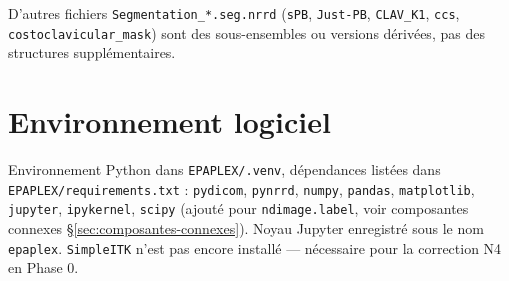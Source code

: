 
D'autres fichiers \texttt{Segmentation\_*.seg.nrrd} (\texttt{sPB}, \texttt{Just-PB},
\texttt{CLAV\_K1}, \texttt{ccs}, \texttt{costoclavicular\_mask}) sont des sous-ensembles ou versions
dérivées, pas des structures supplémentaires.

\section{Environnement logiciel}

Environnement Python dans \texttt{EPAPLEX/.venv}, dépendances listées dans
\texttt{EPAPLEX/requirements.txt} : \texttt{pydicom}, \texttt{pynrrd}, \texttt{numpy}, \texttt{pandas},
\texttt{matplotlib}, \texttt{jupyter}, \texttt{ipykernel}, \texttt{scipy} (ajouté pour
\texttt{ndimage.label}, voir composantes connexes \S\ref{sec:composantes-connexes}). Noyau Jupyter
enregistré sous le nom \texttt{epaplex}. \texttt{SimpleITK} n'est pas encore installé --- nécessaire
pour la correction N4 en Phase 0.
